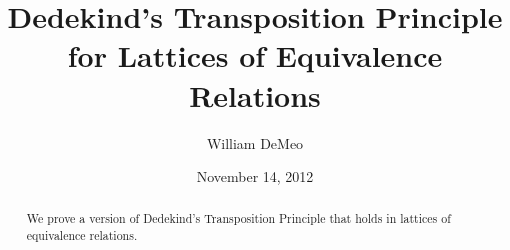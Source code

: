 \documentclass[11pt,reqno]{amsart}
\theoremstyle{plain}
\theoremstyle{definition}
\theoremstyle{remark}
\newcommand{\<}{\ensuremath{\langle}}
\renewcommand{\>}{\ensuremath{\rangle}}
\begin{document}
\title{Dedekind's Transposition Principle for Lattices of Equivalence Relations}
\date{November 14, 2012}
\author{William DeMeo}
\address{Department of Mathematics\\
University of South Carolina\\Columbia 29208\\USA}

\begin{abstract}
We prove a version of Dedekind's Transposition
Principle that holds in  lattices of equivalence relations.
\end{abstract}

\maketitle
\setcounter{section}{+1}
\setcounter{secnumdepth}{2}
\end{document}
